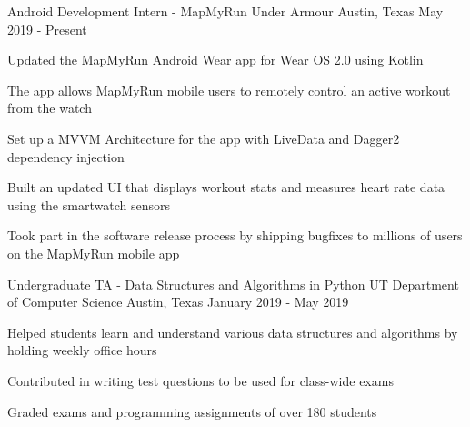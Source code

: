


\begin{cventries}


\cventry
{Android Development Intern - MapMyRun} %
{Under Armour} %
{Austin, Texas} %
{May 2019 - Present} %
{%
\begin{cvitems}
\item {Updated the MapMyRun Android Wear app for Wear OS 2.0 using Kotlin}
\item {The app allows MapMyRun mobile users to remotely control an active workout from the watch}
\item {Set up a MVVM Architecture for the app with LiveData and Dagger2 dependency injection}
\item {Built an updated UI that displays workout stats and measures heart rate data using the smartwatch sensors}
\item {Took part in the software release process by shipping bugfixes to millions of users on the MapMyRun mobile app}
\end{cvitems}
}


\cventry
{Undergraduate TA - Data Structures and Algorithms in Python} %
{UT Department of Computer Science} %
{Austin, Texas} %
{January 2019 - May 2019} %
{ %
\begin{cvitems}
\item {Helped students learn and understand various data structures and algorithms by holding weekly office hours}
\item {Contributed in writing test questions to be used for class-wide exams}
\item {Graded exams and programming assignments of over 180 students}
\end{cvitems}
}


\end{cventries}
